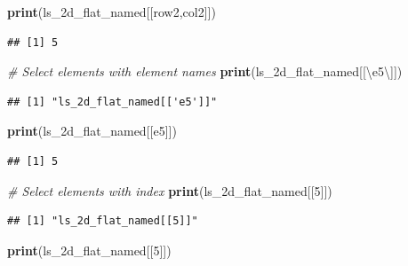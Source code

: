 \documentclass[
]{book}
\newenvironment{Shaded}{\begin{snugshade}}{\end{snugshade}}
\newcommand{\CharTok}[1]{\textcolor[rgb]{0.31,0.60,0.02}{#1}}
\newcommand{\CommentTok}[1]{\textcolor[rgb]{0.56,0.35,0.01}{\textit{#1}}}
\newcommand{\DecValTok}[1]{\textcolor[rgb]{0.00,0.00,0.81}{#1}}
\newcommand{\KeywordTok}[1]{\textcolor[rgb]{0.13,0.29,0.53}{\textbf{#1}}}
\newcommand{\NormalTok}[1]{#1}
\newcommand{\StringTok}[1]{\textcolor[rgb]{0.31,0.60,0.02}{#1}}
\begin{document}
\begin{Shaded}
\begin{Highlighting}[]
\KeywordTok{print}\NormalTok{(ls\_2d\_flat\_named[[}\StringTok{\textquotesingle{}row2\textquotesingle{}}\NormalTok{,}\StringTok{\textquotesingle{}col2\textquotesingle{}}\NormalTok{]])}
\end{Highlighting}
\end{Shaded}

\begin{verbatim}
## [1] 5
\end{verbatim}

\begin{Shaded}
\begin{Highlighting}[]
\CommentTok{\# Select elements with element names}
\KeywordTok{print}\NormalTok{(}\StringTok{\textquotesingle{}ls\_2d\_flat\_named[[}\CharTok{\textbackslash{}\textquotesingle{}}\StringTok{e5}\CharTok{\textbackslash{}\textquotesingle{}}\StringTok{]]\textquotesingle{}}\NormalTok{)}
\end{Highlighting}
\end{Shaded}

\begin{verbatim}
## [1] "ls_2d_flat_named[['e5']]"
\end{verbatim}

\begin{Shaded}
\begin{Highlighting}[]
\KeywordTok{print}\NormalTok{(ls\_2d\_flat\_named[[}\StringTok{\textquotesingle{}e5\textquotesingle{}}\NormalTok{]])}
\end{Highlighting}
\end{Shaded}

\begin{verbatim}
## [1] 5
\end{verbatim}

\begin{Shaded}
\begin{Highlighting}[]
\CommentTok{\# Select elements with index}
\KeywordTok{print}\NormalTok{(}\StringTok{\textquotesingle{}ls\_2d\_flat\_named[[5]]\textquotesingle{}}\NormalTok{)}
\end{Highlighting}
\end{Shaded}

\begin{verbatim}
## [1] "ls_2d_flat_named[[5]]"
\end{verbatim}

\begin{Shaded}
\begin{Highlighting}[]
\KeywordTok{print}\NormalTok{(ls\_2d\_flat\_named[[}\DecValTok{5}\NormalTok{]])}
\end{Highlighting}
\end{Shaded}
\end{document}
